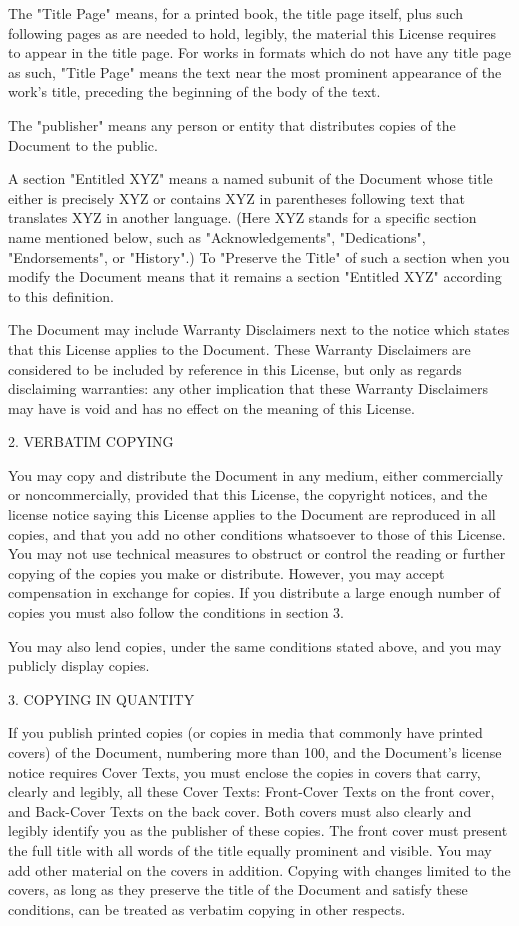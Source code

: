 \documentclass[11pt]{article}
\begin{document}
The "Title Page" means, for a printed book, the title page itself,
plus such following pages as are needed to hold, legibly, the material
this License requires to appear in the title page.  For works in
formats which do not have any title page as such, "Title Page" means
the text near the most prominent appearance of the work's title,
preceding the beginning of the body of the text.

The "publisher" means any person or entity that distributes copies of
the Document to the public.

A section "Entitled XYZ" means a named subunit of the Document whose
title either is precisely XYZ or contains XYZ in parentheses following
text that translates XYZ in another language.  (Here XYZ stands for a
specific section name mentioned below, such as "Acknowledgements",
"Dedications", "Endorsements", or "History".)  To "Preserve the Title"
of such a section when you modify the Document means that it remains a
section "Entitled XYZ" according to this definition.

The Document may include Warranty Disclaimers next to the notice which
states that this License applies to the Document.  These Warranty
Disclaimers are considered to be included by reference in this
License, but only as regards disclaiming warranties: any other
implication that these Warranty Disclaimers may have is void and has
no effect on the meaning of this License.

2. VERBATIM COPYING

You may copy and distribute the Document in any medium, either
commercially or noncommercially, provided that this License, the
copyright notices, and the license notice saying this License applies
to the Document are reproduced in all copies, and that you add no
other conditions whatsoever to those of this License.  You may not use
technical measures to obstruct or control the reading or further
copying of the copies you make or distribute.  However, you may accept
compensation in exchange for copies.  If you distribute a large enough
number of copies you must also follow the conditions in section 3.

You may also lend copies, under the same conditions stated above, and
you may publicly display copies.


3. COPYING IN QUANTITY

If you publish printed copies (or copies in media that commonly have
printed covers) of the Document, numbering more than 100, and the
Document's license notice requires Cover Texts, you must enclose the
copies in covers that carry, clearly and legibly, all these Cover
Texts: Front-Cover Texts on the front cover, and Back-Cover Texts on
the back cover.  Both covers must also clearly and legibly identify
you as the publisher of these copies.  The front cover must present
the full title with all words of the title equally prominent and
visible.  You may add other material on the covers in addition.
Copying with changes limited to the covers, as long as they preserve
the title of the Document and satisfy these conditions, can be treated
as verbatim copying in other respects.
\end{document}
